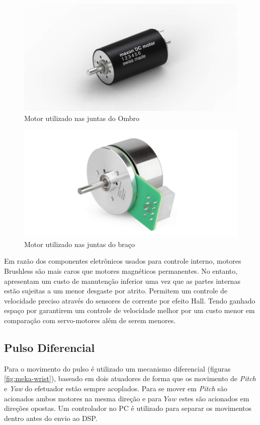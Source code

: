 \begin{figure}[H]
    \centering
    \includegraphics[width = 0.5\linewidth]{figs/maxon_servo.jpg}
    \caption{Motor utilizado nas juntas do Ombro}
    \label{fig:maxon-servo}
\end{figure}

\begin{figure}[H]
    \centering
    \includegraphics[width = 0.5\linewidth]{figs/maxon_flat_servo.jpg}
    \caption{Motor utilizado nas juntas do braço}
    \label{fig:maxon-flat-servo}
\end{figure}

Em razão dos componentes eletrônicos usados para controle interno, motores Brushless são mais caros que motores magnéticos permanentes. No entanto, apresentam um custo de manutenção inferior uma vez que as partes internas estão sujeitas a um menor desgaste por atrito. Permitem um controle de velocidade preciso através do sensores de corrente por efeito Hall. Tendo ganhado espaço por garantirem um controle de velocidade melhor por um custo menor em comparação com servo-motores além de serem menores.


\subsection{Pulso Diferencial}

Para o movimento do pulso é utilizado um mecanismo diferencial (figuras \ref{fig:meka-wrist}), baseado em dois atuadores de forma que os movimento de \textit{Pitch} e \textit{Yaw} do efetuador estão sempre acoplados. Para se mover em \textit{Pitch} são acionados ambos motores na mesma direção e para $Yaw$ estes são acionados em direções opostas. Um controlador no PC é utilizado para separar os movimentos dentro antes do envio ao DSP.

